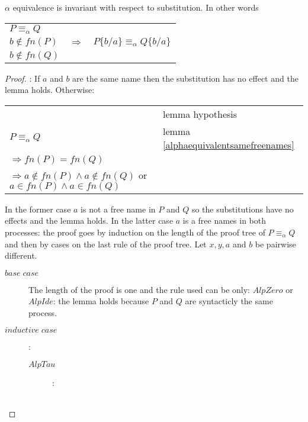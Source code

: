 \begin{lemma}\label{alphaequivalencesubstitution}
  $\alpha$ equivalence is invariant with respect to substitution. In other words 
  \begin{center}
    \begin{tabular}{lll}
	$P\equiv_{\alpha}Q$
      &
	
      &
	
    \\
	$b\notin fn(P)$
      &
	$\Rightarrow$
      &
	$P\{b/a\}\equiv_{\alpha}Q\{b/a\}$
    \\
	$b\notin fn(Q)$
      &
	
      &
	
    \\
    \end{tabular}
  \end{center}
  \begin{proof}:
    If $a$ and $b$ are the same name then the substitution has no effect and the lemma holds. Otherwise:
    \begin{center}
      \begin{tabular}{ll}
	&lemma hypothesis\\
	$P \equiv_{\alpha} Q$&lemma \ref{alphaequivalentsamefreenames}\\
	$\Rightarrow fn(P) = fn(Q)$&\\
	$\Rightarrow a\notin fn(P) \wedge a\notin fn(Q)$ or $a\in fn(P) \wedge a\in fn(Q)$&\\
      \end{tabular}
    \end{center}
    In the former case $a$ is not a free name in $P$ and $Q$ so the substitutions have no effects and the lemma holds. In the latter case $a$ is a free names in both processes: the proof goes by induction on the length of the proof tree of $P\equiv_{\alpha}Q$ and then by cases on the last rule of the proof tree. Let $x,y,a$ and $b$ be pairwise different.
    \begin{description}
      \item[$base\; case$] 
	The length of the proof is one and the rule used can be only: $AlpZero$ or $AlpIde$: the lemma holds because $P$ and $Q$ are syntacticly the same process.
      \item[$inductive\; case$]:
	\begin{description}
	  \item[$AlpTau$]:
	    \begin{center}
	      \begin{tabular}{ll}

\end{tabular}
\end{center}
\end{description}
\end{description}
\end{proof}
\end{lemma}
